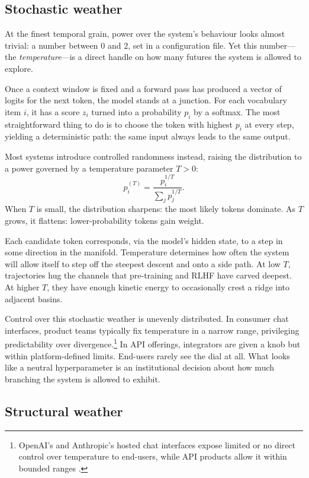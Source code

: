 \documentclass[12pt,a4paper]{article}
\begin{document}
\subsection{Stochastic weather}

At the finest temporal grain, power over the system's behaviour looks almost trivial: a number between $0$ and $2$, set in a configuration file. Yet this number---the \emph{temperature}---is a direct handle on how many futures the system is allowed to explore.

Once a context window is fixed and a forward pass has produced a vector of logits for the next token, the model stands at a junction. For each vocabulary item $i$, it has a score $z_i$ turned into a probability $p_i$ by a softmax. The most straightforward thing to do is to choose the token with highest $p_i$ at every step, yielding a deterministic path: the same input always leads to the same output.

Most systems introduce controlled randomness instead, raising the distribution to a power governed by a temperature parameter $T>0$:
\[
p_i^{(T)} = \frac{p_i^{1/T}}{\sum_j p_j^{1/T}}.
\]
When $T$ is small, the distribution sharpens: the most likely tokens dominate. As $T$ grows, it flattens: lower-probability tokens gain weight.

Each candidate token corresponds, via the model's hidden state, to a step in some direction in the manifold. Temperature determines how often the system will allow itself to step off the steepest descent and onto a side path. At low $T$, trajectories hug the channels that pre-training and RLHF have carved deepest. At higher $T$, they have enough kinetic energy to occasionally crest a ridge into adjacent basins.

Control over this stochastic weather is unevenly distributed. In consumer chat interfaces, product teams typically fix temperature in a narrow range, privileging predictability over divergence.\footnote{OpenAI's and Anthropic's hosted chat interfaces expose limited or no direct control over temperature to end-users, while API products allow it within bounded ranges \cite{openai_api,anthropic_docs}.} In API offerings, integrators are given a knob but within platform-defined limits. End-users rarely see the dial at all. What looks like a neutral hyperparameter is an institutional decision about how much branching the system is allowed to exhibit.

\subsection{Structural weather}
\end{document}
